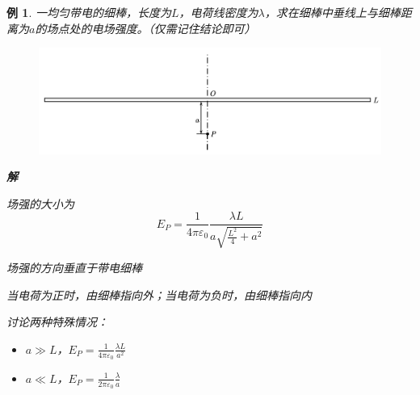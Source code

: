 \documentclass[12pt, a4paper, twoside]{ctexbook}
\newtheorem{example}[theorem]{例}
\begin{document}
\begin{example}
    一均匀带电的细棒，长度为$L$，电荷线密度为$\lambda$，求在细棒中垂线上与细棒距离为$a$的场点处的电场强度。{\sonti （仅需记住结论即可）}
    \begin{figure}[H]
        \centerline{\includegraphics[scale=0.8]{CH09EX01.pdf}}
    \end{figure}
    \noindent\textbf{解}

    场强的大小为
    $$
    E_P=\frac{1}{4\pi\varepsilon_0}\frac{\lambda L}{a\sqrt{\frac{L^2}{4}+a^2}}
    $$
    
    场强的方向垂直于带电细棒
    
    当电荷为正时，由细棒指向外；当电荷为负时，由细棒指向内
    
    {\sonti 讨论两种特殊情况}：
    \begin{itemize}
        \item $a\gg L$，$E_P=\frac{1}{4\pi\varepsilon_0}\frac{\lambda L}{a^2}$
        \item $a\ll L$，$E_P=\frac{1}{2\pi\varepsilon_0}\frac{\lambda}{a}$
    \end{itemize}
\end{example}
\newpage
\end{document}

